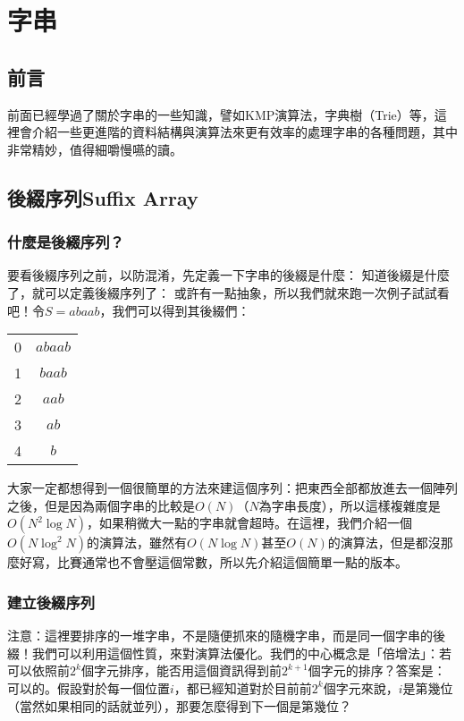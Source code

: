 \chapter{字串\uppercase\expandafter{}}
\section{前言}
		前面已經學過了關於字串的一些知識，譬如KMP演算法，字典樹（Trie）等，這裡會介紹一些更進階的資料結構與演算法來更有效率的處理字串的各種問題，其中非常精妙，值得細嚼慢嚥的讀。
	\section{後綴序列Suffix Array}
		\subsection{什麼是後綴序列？}
			要看後綴序列之前，以防混淆，先定義一下字串的後綴是什麼：
			知道後綴是什麼了，就可以定義後綴序列了：
			或許有一點抽象，所以我們就來跑一次例子試試看吧！令$S = abaab$，我們可以得到其後綴們：
			\begin{center}
				\begin{tabular}{c  c}
					0&$abaab$\\
					1&$baab$\\
					2&$aab$\\
					3&$ab$\\
					4&$b$\\
				\end{tabular}
			\end{center}
			大家一定都想得到一個很簡單的方法來建這個序列：把東西全部都放進去一個陣列之後，但是因為兩個字串的比較是$O(N)$（$N$為字串長度），所以這樣複雜度是$O(N^2 \log N)$，如果稍微大一點的字串就會超時。在這裡，我們介紹一個$O(N \log^2 N)$的演算法，雖然有$O(N \log N)$甚至$O(N)$的演算法，但是都沒那麼好寫，比賽通常也不會壓這個常數，所以先介紹這個簡單一點的版本。
		\subsection{建立後綴序列}
			注意：這裡要排序的一堆字串，不是隨便抓來的隨機字串，而是同一個字串的後綴！我們可以利用這個性質，來對演算法優化。我們的中心概念是「倍增法」：若可以依照前$2^k$個字元排序，能否用這個資訊得到前$2^{k + 1}$個字元的排序？答案是：可以的。假設對於每一個位置$i$，都已經知道對於目前前$2^k$個字元來說，$i$是第幾位（當然如果相同的話就並列），那要怎麼得到下一個是第幾位？
			
